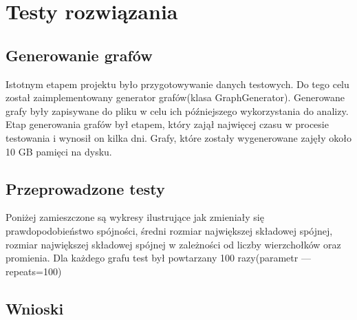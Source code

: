 \section{Testy rozwiązania}
	\label{final:testy}

	\subsection{Generowanie grafów}
		\label{final:testy:generowanie}

		Istotnym etapem projektu było przygotowywanie danych testowych. Do tego celu został zaimplementowany generator grafów(klasa GraphGenerator). Generowane grafy były zapisywane do pliku w celu ich późniejszego wykorzystania do analizy. Etap generowania grafów był etapem, który zajął najwięcej czasu w procesie testowania i wynosił on kilka dni. Grafy, które zostały wygenerowane zajęły około 10 GB pamięci na dysku.
	\subsection{Przeprowadzone testy}
		\label{final:testy:przyklad1}
		Poniżej zamieszczone są wykresy ilustrujące jak zmieniały się prawdopodobieństwo spójności, średni rozmiar największej składowej spójnej, rozmiar największej składowej spójnej w zależności od liczby wierzchołków oraz promienia. Dla każdego grafu test był powtarzany 100 razy(parametr ---repeats=100)

		
		
		
		
		
		
		
		
		
		
		
		

	\subsection{Wnioski}
		\label{final:testy:wnioski}
	

